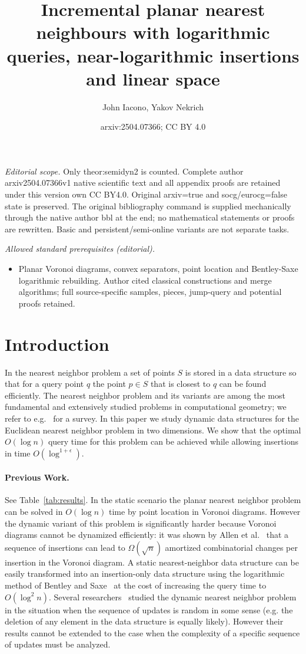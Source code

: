 \documentclass[10pt,a4paper]{amsart}
\title{Incremental planar nearest neighbours with logarithmic queries, near-logarithmic insertions and linear space}
\author{John Iacono, Yakov Nekrich}
\date{arxiv:2504.07366; CC BY 4.0}
\begin{document}
\maketitle
\noindent\textit{Editorial scope.} Only theor:semidyn2 is counted. Complete author arxiv2504.07366v1 native scientific text and all appendix proofs are retained under this version own CC BY4.0. Original arxiv=true and socg/eurocg=false state is preserved. The original bibliography command is supplied mechanically through the native author bbl at the end; no mathematical statements or proofs are rewritten. Basic and persistent/semi-online variants are not separate tasks.\par\medskip
\noindent\textit{Allowed standard prerequisites (editorial).}\begin{itemize}
\item Planar Voronoi diagrams, convex separators, point location and Bentley-Saxe logarithmic rebuilding. Author cited classical constructions and merge algorithms; full source-specific samples, pieces, jump-query and potential proofs retained.
\end{itemize}\medskip
\section{Introduction}
\label{sec:intro}
In the nearest neighbor problem a set of points $S$ is stored in a data structure so that for a query point $q$ the point $p\in S$ that is closest to $q$ can be found efficiently. The nearest neighbor problem and its variants are among the most fundamental and extensively studied problems in computational geometry; we refer to e.g.~\cite{survey1} for a survey. In this paper we study dynamic data structures for the Euclidean nearest neighbor problem in two dimensions. We show that 
the optimal $O(\log n)$ query time for this problem can be achieved while allowing insertions in time $O(\log^{1+\epsilon})$. 


\paragraph*{Previous Work.}
See Table~\ref{tab:results}.
In the static scenario the planar nearest neighbor  problem can be solved in $O(\log n)$ time by point location in  Voronoi diagrams.  However the dynamic variant of this problem is significantly harder because Voronoi diagrams cannot be dynamized efficiently:  it was shown by Allen et al.\ \cite{AllenBIL17} that a sequence of insertions can lead to $\Omega(\sqrt{n})$ amortized combinatorial changes per insertion in the Voronoi diagram. A static nearest-neighbor data structure can be easily transformed into an insertion-only data structure using the logarithmic method of Bentley and Saxe~\cite{BentleyS80} at the cost of increasing the query time to $O(\log^2 n)$. Several researchers~\cite{DevillersMT92,ClarksonMS93,Mulmuley94book} studied the dynamic nearest neighbor problem in the situation when the sequence of updates is random in some sense (e.g. the deletion of any element in the data structure is equally likely). However their results cannot be extended to the case when the complexity of a specific sequence of updates must be analyzed.
\end{document}
